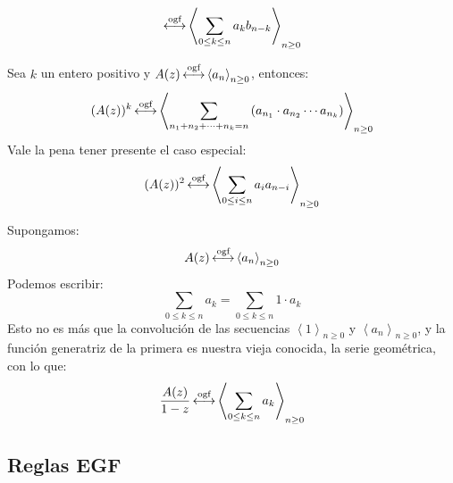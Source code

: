 \begin{description}
\begin{equation*}
        \operatorname{\stackrel{\text{ogf}}{\longleftrightarrow}} \left\langle
               \sum_{0 \le k \le n} a_k b_{n - k}
              \right\rangle_{n \ge 0}
    \end{equation*}
  \item
    Sea \(k\) un entero positivo
    y \(A(z) \operatorname{\stackrel{\text{ogf}}{\longleftrightarrow}} \left\langle a_n\right\rangle_{n \ge 0}\),
    entonces:
    \begin{equation*}
      (A(z))^k
        \operatorname{\stackrel{\text{ogf}}{\longleftrightarrow}} \left\langle \sum_{n_1 + n_2 + \dotsb + n_k = n}
               \left( a_{n_1} \cdot a_{n_2} \dotsm a_{n_k} \right)
             \right\rangle_{n \ge 0}
    \end{equation*}
    Vale la pena tener presente el caso especial:
    \begin{equation*}
      (A(z))^2
        \operatorname{\stackrel{\text{ogf}}{\longleftrightarrow}} \left\langle
               \sum_{0 \le i \le n} a_i a_{n - i}
             \right\rangle_{n \ge 0}
    \end{equation*}
  \item[Sumas parciales:]
    Supongamos:
    \begin{equation*}
      A(z) \operatorname{\stackrel{\text{ogf}}{\longleftrightarrow}} \left\langle a_n \right\rangle_{n \ge 0}
    \end{equation*}
    Podemos escribir:
    \begin{equation*}
      \sum_{0 \le k \le n} a_k
        = \sum_{0 \le k \le n} 1 \cdot a_k
    \end{equation*}
    Esto no es más que la convolución de las secuencias
    \(\left\langle 1 \right\rangle_{n \ge 0}\)
    y \(\left\langle a_n \right\rangle_{n \ge 0}\),
    y la función generatriz de la primera es nuestra vieja conocida,
    la serie geométrica,
    con lo que:
    \begin{equation}
      \label{eq:sumas-parciales}
      \frac{A(z)}{1 - z}
        \operatorname{\stackrel{\text{ogf}}{\longleftrightarrow}} \left\langle
               \sum_{0 \le k \le n} a_k
             \right\rangle_{n \ge 0}
    \end{equation}
  \end{description}

\subsection{Reglas EGF}
\label{sec:reglas-EGF}

